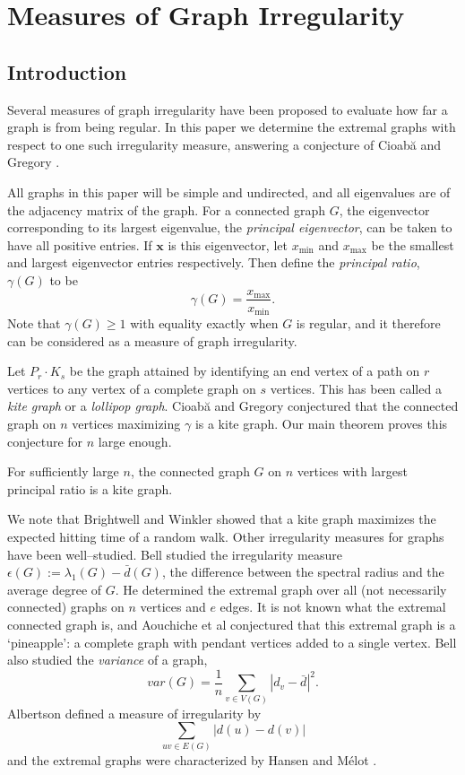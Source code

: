 \chapter{Measures of Graph Irregularity}
\section{Introduction}

Several measures of graph irregularity have been proposed to evaluate how far a graph is
from being regular.  In this paper we determine the extremal graphs
with respect to one such irregularity measure,
answering a conjecture of Cioab\u{a} and Gregory \cite{CioabaGregory2007}.

All graphs in this paper will be simple and undirected, and all
eigenvalues are of the adjacency matrix of the graph.
For a connected graph $G$, the eigenvector corresponding to its largest
eigenvalue, the \textit{principal eigenvector}, can be taken to have
all positive entries. If $\textbf{x}$ is this eigenvector, let
$x_{\text{min}}$ and $x_{\text{max}}$ be the smallest and largest eigenvector
entries respectively.  Then define the \textit{principal ratio},
$\gamma(G)$ to be
 \[ \gamma(G) = \frac{x_{\text{max}}}{x_{\text{min}}} .\]
Note that $\gamma(G) \geq 1$ with equality exactly when $G$ is regular,
and it therefore can be considered as a measure of graph irregularity.

Let $P_r \cdot K_s$ be the graph attained by identifying an end vertex
of a path on $r$ vertices to any vertex of a complete graph
on $s$ vertices.  This has been called a \textit{kite graph} or a
\textit{lollipop graph}.  Cioab\u{a} and Gregory \cite{CioabaGregory2007}
conjectured that the connected graph on $n$ vertices maximizing $\gamma$
is a kite graph.  Our main theorem proves this conjecture for $n$ large
enough.

\begin{theorem}\label{main_theorem}
  For sufficiently large $n$, the connected graph $G$ on $n$
  vertices with largest principal ratio is a kite graph.
\end{theorem}

We note that Brightwell and Winkler \cite{BrightwellWinkler1990} showed that
a kite graph maximizes the expected hitting time of a random walk.
Other irregularity measures for graphs have been well--studied.
Bell \cite{Bell1992} studied the irregularity measure $\epsilon(G) := \lambda_1(G) - \bar{d}(G)$,
the difference between the spectral radius and the average degree of $G$.
He determined the extremal graph over all (not necessarily connected)
graphs on $n$ vertices and $e$ edges.  It is not known what the extremal
connected graph is, and Aouchiche et al \cite{Aouchiche2008} conjectured that this extremal
graph is a `pineapple': a complete graph with pendant vertices added
to a single vertex.  Bell also studied the
\textit{variance} of a graph,
 \[var(G) = \frac{1}{n} \sum_{v\in V(G)} \left| d_v - \bar{d} \right|^2 . \]
 Albertson \cite{Albertson1997} defined a measure of irregularity by 
 \[
 \sum_{uv\in E(G)} |d(u) - d(v)|
 \]
 and the extremal graphs were characterized by Hansen and M\'elot \cite{HansenMelot2002}. 
 
